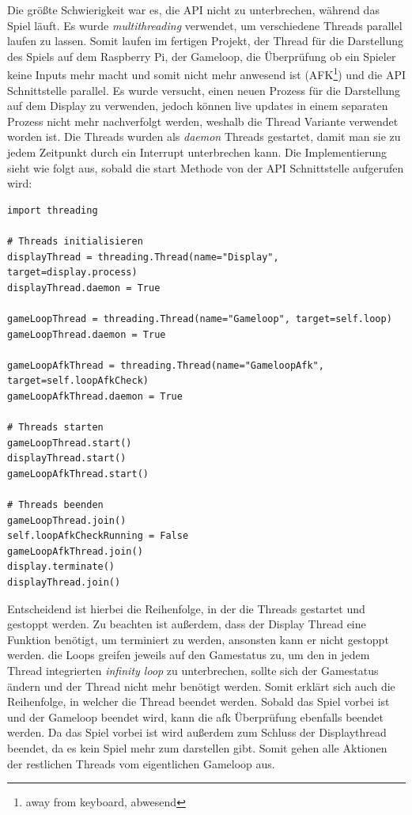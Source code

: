 \documentclass[a4paper,12pt]{scrartcl}
\begin{document}
Die größte Schwierigkeit war es, die API nicht zu unterbrechen, während das Spiel läuft. Es wurde \textit{multithreading} verwendet, um verschiedene Threads parallel laufen zu lassen. Somit laufen im fertigen Projekt, der Thread für die Darstellung des Spiels auf dem Raspberry Pi, der Gameloop, die Überprüfung ob ein Spieler keine Inputs mehr macht und somit nicht mehr anwesend ist (AFK\footnote{away from keyboard, abwesend}) und die API Schnittstelle parallel. Es wurde versucht, einen neuen Prozess für die Darstellung auf dem Display zu verwenden, jedoch können live updates in einem separaten Prozess nicht mehr nachverfolgt werden, weshalb die Thread Variante verwendet worden ist. Die Threads wurden als \textit{daemon} Threads gestartet, damit man sie zu jedem Zeitpunkt durch ein Interrupt unterbrechen kann. Die Implementierung sieht wie folgt aus, sobald die start Methode von der API Schnittstelle aufgerufen wird:

\begin{lstlisting}
import threading

# Threads initialisieren
displayThread = threading.Thread(name="Display", target=display.process)
displayThread.daemon = True

gameLoopThread = threading.Thread(name="Gameloop", target=self.loop)
gameLoopThread.daemon = True

gameLoopAfkThread = threading.Thread(name="GameloopAfk", target=self.loopAfkCheck)
gameLoopAfkThread.daemon = True
        
# Threads starten
gameLoopThread.start()
displayThread.start()
gameLoopAfkThread.start()

# Threads beenden
gameLoopThread.join()
self.loopAfkCheckRunning = False
gameLoopAfkThread.join()
display.terminate()
displayThread.join()
\end{lstlisting}

Entscheidend ist hierbei die Reihenfolge, in der die Threads gestartet und gestoppt werden. Zu beachten ist außerdem, dass der Display Thread eine Funktion benötigt, um terminiert zu werden, ansonsten kann er nicht gestoppt werden. die Loops greifen jeweils auf den Gamestatus zu, um den in jedem Thread integrierten \textit{infinity loop} zu unterbrechen, sollte sich der Gamestatus ändern und der Thread nicht mehr benötigt werden. Somit erklärt sich auch die Reihenfolge, in welcher die Thread beendet werden. Sobald das Spiel vorbei ist und der Gameloop beendet wird, kann die afk Überprüfung ebenfalls beendet werden. Da das Spiel vorbei ist wird außerdem zum Schluss der Displaythread beendet, da es kein Spiel mehr zum darstellen gibt. Somit gehen alle Aktionen der restlichen Threads vom eigentlichen Gameloop aus.
\end{document}
